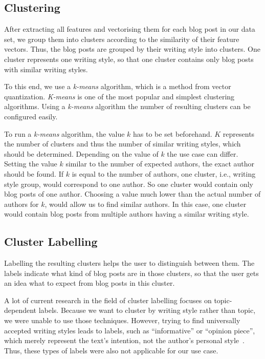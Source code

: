 
\subsection{Clustering}
\label{sec:clustering}

After extracting all features and vectorising them for each blog post in our data set, we group them into clusters according to the similarity of their feature vectors.
Thus, the blog posts are grouped by their writing style into clusters.
One cluster represents one writing style, so that one cluster contains only blog posts with similar writing styles.


To this end, we use a \textit{k-means} algorithm, which is a method from vector quantization.
\textit{K-means} is one of the most popular and simplest clustering algorithms.
Using a \textit{k-means} algorithm the number of resulting clusters can be configured easily.


To run a \textit{k-means} algorithm, the value $k$ has to be set beforehand.
$K$ represents the number of clusters and thus the number of similar writing styles, which should be determined.
Depending on the value of $k$ the use case can differ.
Setting the value $k$ similar to the number of expected authors, the exact author should be found.
If $k$ is equal to the number of authors, one cluster, i.e., writing style group, would correspond to one author.
So one cluster would contain only blog posts of one author.
Choosing a value much lower than the actual number of authors for $k$, would allow us to find similar authors.
In this case, one cluster would contain blog posts from multiple authors having a similar writing style.



\subsection{Cluster Labelling}
\label{sec:cluster_labeling}

Labelling the resulting clusters helps the user to distinguish between them.
The labels indicate what kind of blog posts are in those clusters, so that the user gets an idea what to expect from blog posts in this cluster.


A lot of current research in the field of cluster labelling focuses on topic-dependent labels.
Because we want to cluster by writing style rather than topic, we were unable to use those techniques.
However, trying to find universally accepted writing styles leads to labels, such as ``informative'' or ``opinion piece'', which merely represent the text's intention, not the author's personal style~\cite{lee2001genres}.
Thus, these types of labels were also not applicable for our use case.


